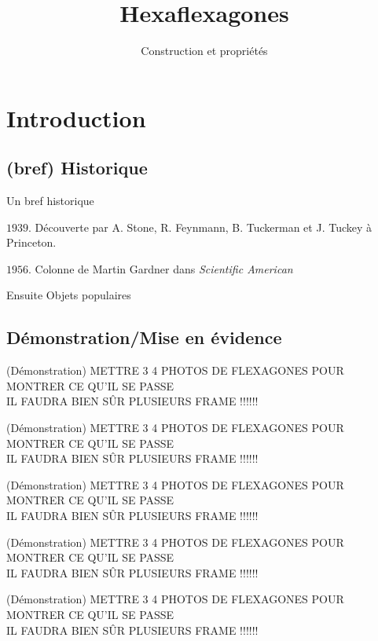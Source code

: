 \documentclass[french,xcolor=dvipsnames]{beamer}
\begin{document}
	\title{Hexaflexagones}
	\subtitle{Construction et propriétés}
	\frame[plain]{\maketitle}
	

\AtBeginSection
{
}

	
	\section{Introduction}
		\subsection{(bref) Historique}
		\begin{frame}{Un bref historique}

			\begin{list}{Intro}{}
				\item[$\textit{1939}$.] Découverte  par A. Stone, R. Feynmann, B. Tuckerman et J. Tuckey à Princeton.
				\item[$\textit{1956}$.]Colonne de Martin Gardner dans \textit{Scientific American}
				\item[Ensuite] Objets populaires 
			\end{list}
		\end{frame}
		
		\subsection{Démonstration/Mise en évidence}
		\begin{frame}{(Démonstration)}
			METTRE 3 4 PHOTOS DE FLEXAGONES POUR MONTRER CE QU'IL SE PASSE\\
			IL FAUDRA BIEN SÛR PLUSIEURS FRAME !!!!!!
		\end{frame}
		\begin{frame}{(Démonstration)}
			METTRE 3 4 PHOTOS DE FLEXAGONES POUR MONTRER CE QU'IL SE PASSE\\
			IL FAUDRA BIEN SÛR PLUSIEURS FRAME !!!!!!
		\end{frame}
		\begin{frame}{(Démonstration)}
			METTRE 3 4 PHOTOS DE FLEXAGONES POUR MONTRER CE QU'IL SE PASSE\\
			IL FAUDRA BIEN SÛR PLUSIEURS FRAME !!!!!!
		\end{frame}
		\begin{frame}{(Démonstration)}
			METTRE 3 4 PHOTOS DE FLEXAGONES POUR MONTRER CE QU'IL SE PASSE\\
			IL FAUDRA BIEN SÛR PLUSIEURS FRAME !!!!!!
		\end{frame}
		\begin{frame}{(Démonstration)}
			METTRE 3 4 PHOTOS DE FLEXAGONES POUR MONTRER CE QU'IL SE PASSE\\
			IL FAUDRA BIEN SÛR PLUSIEURS FRAME !!!!!!
		\end{frame}
		
\end{document}
